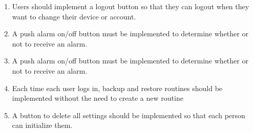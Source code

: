 \begin{enumerate}[label=\arabic*.]
\begin{enumerate}[label*={\arabic*.},ref=\theenumi.\arabic*]
        \item Users should implement a logout button so that they can logout when they want to change their device or account.\\

        \item A push alarm on/off button must be implemented to determine whether or not to receive an alarm.\\

        \item A push alarm on/off button must be implemented to determine whether or not to receive an alarm.\\
        
        \item Each time each user logs in, backup and restore routines should be implemented without the need to create a new routine\\
        
        \item A button to delete all settings should be implemented so that each person can initialize them.\\

    \end{enumerate}
\end{enumerate}